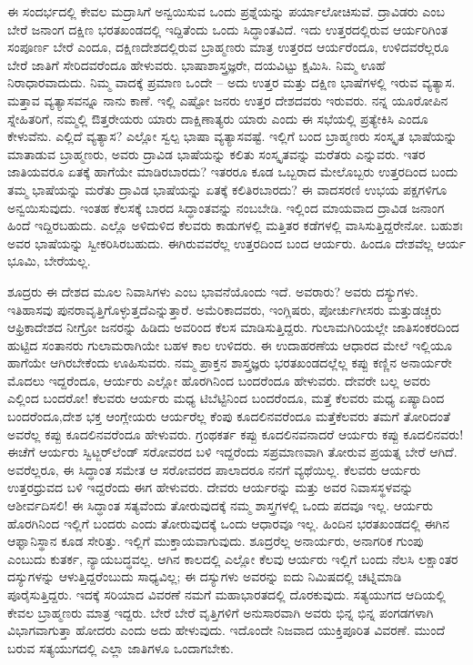 \vskip 2pt

ಈ ಸಂದರ್ಭದಲ್ಲಿ ಕೇವಲ ಮದ್ರಾಸಿಗೆ ಅನ್ವಯಿಸುವ ಒಂದು ಪ್ರಶ್ನೆಯನ್ನು ಪರ್ಯಾಲೋಚಿಸುವೆ. ದ್ರಾವಿಡರು ಎಂಬ ಬೇರೆ ಜನಾಂಗ ದಕ್ಷಿಣ ಭರತಖಂಡದಲ್ಲಿ ಇದ್ದಿತೆಂದು ಒಂದು ಸಿದ್ಧಾಂತವಿದೆ. ಇದು ಉತ್ತರದಲ್ಲಿರುವ ಆರ್ಯರಿಗಿಂತ ಸಂಪೂರ್ಣ ಬೇರೆ ಎಂದೂ, ದಕ್ಷಿಣದೇಶದಲ್ಲಿರುವ ಬ್ರಾಹ್ಮಣರು ಮಾತ್ರ ಉತ್ತರದ ಆರ್ಯರೆಂದೂ, ಉಳಿದವರೆಲ್ಲರೂ ಬೇರೆ ಜಾತಿಗೆ ಸೇರಿದವರೆಂದೂ ಹೇಳುವರು. ಭಾಷಾಶಾಸ್ತ್ರಜ್ಞರೇ, ದಯವಿಟ್ಟು ಕ್ಷಮಿಸಿ. ನಿಮ್ಮ ಊಹೆ ನಿರಾಧಾರವಾದುದು. ನಿಮ್ಮ ವಾದಕ್ಕೆ ಪ್ರಮಾಣ ಒಂದೇ – ಅದು ಉತ್ತರ ಮತ್ತು ದಕ್ಷಿಣ ಭಾಷೆಗಳಲ್ಲಿ ಇರುವ ವ್ಯತ್ಯಾಸ. ಮತ್ತಾವ ವ್ಯತ್ಯಾಸವನ್ನೂ ನಾನು ಕಾಣೆ. ಇಲ್ಲಿ ಎಷ್ಟೋ ಜನರು ಉತ್ತರ ದೇಶದವರು ಇರುವರು. ನನ್ನ ಯೂರೋಪಿನ ಸ್ನೇಹಿತರಿಗೆ, ನಮ್ಮಲ್ಲಿ ಔತ್ತರೇಯರು ಯಾರು ದಾಕ್ಷಿಣಾತ್ಯರು ಯಾರು ಎಂದು ಈ ಸಭೆಯಲ್ಲಿ ಪ್ರತ್ಯೇಕಿಸಿ ಎಂದೂ ಕೇಳುವೆನು. ಎಲ್ಲಿದೆ ವ್ಯತ್ಯಾಸ? ಎಲ್ಲೋ ಸ್ವಲ್ಪ ಭಾಷಾ ವ್ಯತ್ಯಾಸವಷ್ಟೆ. ಇಲ್ಲಿಗೆ ಬಂದ ಬ್ರಾಹ್ಮಣರು ಸಂಸ್ಕೃತ ಭಾಷೆಯನ್ನು ಮಾತಾಡುವ ಬ್ರಾಹ್ಮಣರು, ಅವರು ದ್ರಾವಿಡ ಭಾಷೆಯನ್ನು ಕಲಿತು ಸಂಸ್ಕೃತವನ್ನು ಮರೆತರು ಎನ್ನುವರು. ಇತರ ಜಾತಿಯವರೂ ಏತಕ್ಕೆ ಹಾಗೆಯೇ ಮಾಡಿರ\-ಬಾರದು? ಇತರರೂ ಕೂಡ ಒಬ್ಬರಾದ ಮೇಲೊಬ್ಬರು ಉತ್ತರದಿಂದ ಬಂದು ತಮ್ಮ ಭಾಷೆಯನ್ನು ಮರೆತು ದ್ರಾವಿಡ ಭಾಷೆಯನ್ನು ಏತಕ್ಕೆ ಕಲಿತಿರಬಾರದು? ಈ ವಾದಸರಣಿ ಉಭಯ ಪಕ್ಷಗಳಿಗೂ ಅನ್ವಯಿಸುವುದು. ಇಂತಹ ಕೆಲಸಕ್ಕೆ ಬಾರದ ಸಿದ್ಧಾಂತವನ್ನು ನಂಬಬೇಡಿ. ಇಲ್ಲಿಂದ ಮಾಯವಾದ ದ್ರಾವಿಡ ಜನಾಂಗ ಹಿಂದೆ ಇದ್ದಿರಬಹುದು. ಎಲ್ಲೊ ಅಳಿದುಳಿದ ಕೆಲವರು ಕಾಡುಗಳಲ್ಲಿ ಮತ್ತಿತರ ಕಡೆಗಳಲ್ಲಿ ವಾಸಿಸುತ್ತಿದ್ದರೇನೋ. ಬಹುಶಃ ಅವರ ಭಾಷೆಯನ್ನು ಸ್ವೀಕರಿಸಿರಬಹುದು. ಈಗಿರುವವರೆಲ್ಲ ಉತ್ತರದಿಂದ ಬಂದ ಆರ್ಯರು. ಹಿಂದೂ ದೇಶವೆಲ್ಲ ಆರ್ಯ ಭೂಮಿ, ಬೇರೆಯಲ್ಲ.

\vskip 2pt

ಶೂದ್ರರು ಈ ದೇಶದ ಮೂಲ ನಿವಾಸಿಗಳು ಎಂಬ ಭಾವನೆಯೊಂದು ಇದೆ. ಅವರಾರು? ಅವರು ದಸ್ಯುಗಳು. ಇತಿಹಾಸವು ಪುನರಾವೃತ್ತಿಗೊಳ್ಳುತ್ತದೆ\break ಎನ್ನುತ್ತಾರೆ. ಅಮೆರಿಕಾದವರು, ಇಂಗ್ಲಿಷರು, ಪೋರ್ಚುಗೀಸರು ಮತ್ತು\break ಡಚ್ಚರು ಆಫ್ರಿಕಾದೇಶದ ನೀಗ್ರೋ ಜನರನ್ನು ಹಿಡಿದು ಅವರಿಂದ ಕೆಲಸ ಮಾಡಿಸು\-ತ್ತಿದ್ದರು. ಗುಲಾಮಗಿರಿಯಲ್ಲೇ ಜಾತಿಸಂಕರದಿಂದ ಹುಟ್ಟಿದ ಸಂತಾನರು ಗುಲಾಮರಾಗಿಯೇ ಬಹಳ ಕಾಲ ಉಳಿದರು. ಈ ಉದಾಹರಣೆಯ ಆಧಾರದ ಮೇಲೆ ಇಲ್ಲಿಯೂ ಹಾಗೆಯೇ ಆಗಿರಬೇಕೆಂದು ಊಹಿಸುವರು. ನಮ್ಮ ಪ್ರಾಕ್ತನ ಶಾಸ್ತ್ರಜ್ಞರು ಭರತಖಂಡದಲ್ಲೆಲ್ಲ ಕಪ್ಪು ಕಣ್ಣಿನ ಅನಾರ್ಯರೇ ಮೊದಲು ಇದ್ದರೆಂದೂ, ಆರ್ಯರು ಎಲ್ಲೋ ಹೊರಗಿನಿಂದ ಬಂದರೆಂದೂ ಹೇಳುವರು. ದೇವರೇ ಬಲ್ಲ ಅವರು ಎಲ್ಲಿಂದ ಬಂದರೋ! ಕೆಲವರು ಆರ್ಯರು ಮಧ್ಯ ಟಿಬೆಟ್ಟಿನಿಂದ ಬಂದರೆಂದೂ, ಮತ್ತೆ ಕೆಲವರು ಮಧ್ಯ ಏಷ್ಯಾದಿಂದ ಬಂದರೆಂದೂ,\break ದೇಶ ಭಕ್ತ ಆಂಗ್ಲೇಯರು ಆರ್ಯರೆಲ್ಲ ಕೆಂಪು ಕೂದಲಿನವರೆಂದೂ ಮತ್ತೆ\break ಕೆಲವರು ತಮಗೆ ತೋರಿದಂತೆ ಅವರೆಲ್ಲ ಕಪ್ಪು ಕೂದಲಿನವರೆಂದೂ ಹೇಳುವರು. ಗ್ರಂಥಕರ್ತ ಕಪ್ಪು ಕೂದಲಿನವನಾದರೆ ಆರ್ಯರು ಕಪ್ಪು ಕೂದಲಿನವರು! ಈಚೆಗೆ ಆರ್ಯರು ಸ್ವಿಟ್ಜರ್​ಲೆಂಡ್​ ಸರೋವರದ ಬಳಿ ಇದ್ದರೆಂದು ಸಪ್ರಮಾಣವಾಗಿ ತೋರುವ ಪ್ರಯತ್ನ ಬೇರೆ ಆಗಿದೆ. ಅವರೆಲ್ಲರೂ, ಈ ಸಿದ್ಧಾಂತ ಸಮೇತ ಆ ಸರೋವರದ ಪಾಲಾದರೂ ನನಗೆ ವ್ಯಥೆಯಿಲ್ಲ. ಕೆಲವರು ಆರ್ಯರು ಉತ್ತರಧ್ರುವದ ಬಳಿ ಇದ್ದರೆಂದು ಈಗ ಹೇಳುವರು. ದೇವರು ಆರ್ಯರನ್ನು ಮತ್ತು ಅವರ ನಿವಾಸಸ್ಥಳವನ್ನು ಆಶೀರ್ವದಿಸಲಿ! ಈ ಸಿದ್ಧಾಂತ ಸತ್ಯವೆಂದು ತೋರುವುದಕ್ಕೆ ನಮ್ಮ ಶಾಸ್ತ್ರಗಳಲ್ಲಿ ಒಂದು ಪದವೂ ಇಲ್ಲ. ಆರ್ಯರು ಹೊರಗಿನಿಂದ ಇಲ್ಲಿಗೆ ಬಂದರು ಎಂದು ತೋರುವುದಕ್ಕೆ ಒಂದು ಆಧಾರವೂ ಇಲ್ಲ. ಹಿಂದಿನ ಭರತಖಂಡದಲ್ಲಿ ಈಗಿನ ಆಫ್ಘಾನಿಸ್ಥಾನ ಕೂಡ ಸೇರಿತ್ತು. ಇಲ್ಲಿಗೆ ಮುಕ್ತಾಯವಾಗುವುದು. ಶೂದ್ರರೆಲ್ಲ ಅನಾರ್ಯರು, ಅನಾಗರಿಕ ಗುಂಪು ಎಂಬುದು ಕುತರ್ಕ, ನ್ಯಾಯಬದ್ಧವಲ್ಲ. ಆಗಿನ ಕಾಲದಲ್ಲಿ ಎಲ್ಲೋ ಕೆಲವು ಆರ್ಯರು ಇಲ್ಲಿಗೆ ಬಂದು ನೆಲಸಿ ಲಕ್ಷಾಂತರ ದಸ್ಯುಗಳನ್ನು ಆಳುತ್ತಿದ್ದರೆಂಬುದು ಸಾಧ್ಯವಿಲ್ಲ; ಈ ದಸ್ಯುಗಳು ಅವರನ್ನು ಐದು ನಿಮಿಷದಲ್ಲಿ ಚಟ್ನಿಮಾಡಿ ಪೂರೈಸುತ್ತಿದ್ದರು. ಇದಕ್ಕೆ ಸರಿಯಾದ ವಿವರಣೆ ನಮಗೆ ಮಹಾಭಾರತದಲ್ಲಿ ದೊರಕುವುದು. ಸತ್ಯಯುಗದ ಆದಿಯಲ್ಲಿ ಕೇವಲ ಬ್ರಾಹ್ಮಣರು ಮಾತ್ರ ಇದ್ದರು. ಬೇರೆ ಬೇರೆ ವೃತ್ತಿಗಳಿಗೆ ಅನುಸಾರವಾಗಿ ಅವರು ಭಿನ್ನ ಭಿನ್ನ ಪಂಗಡಗಳಾಗಿ ವಿಭಾಗವಾಗುತ್ತಾ ಹೋದರು ಎಂದು ಅದು ಹೇಳುವುದು. ಇದೊಂದೇ ನಿಜವಾದ ಯುಕ್ತಿಪೂರಿತ ವಿವರಣೆ. ಮುಂದೆ ಬರುವ ಸತ್ಯಯುಗದಲ್ಲಿ ಎಲ್ಲಾ ಜಾತಿಗಳೂ ಒಂದಾಗಬೇಕು.


